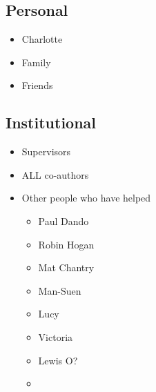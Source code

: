 \subsection*{Personal}
\begin{itemize}
    \item Charlotte
    \item Family
    \item Friends
\end{itemize}
\subsection*{Institutional}
\begin{itemize}
    \item Supervisors
    \item ALL co-authors
    \item Other people who have helped
    \begin{itemize}
        \item Paul Dando
        \item Robin Hogan
        \item Mat Chantry
        \item Man-Suen
        \item Lucy
        \item Victoria
        \item Lewis O?
        \item 
    \end{itemize}
\end{itemize}